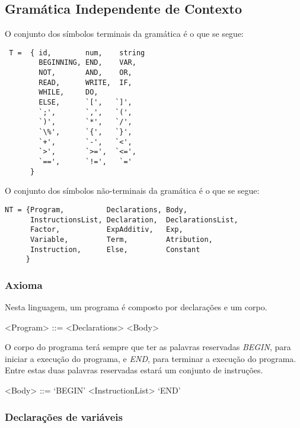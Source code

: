 \subsection{Gramática Independente de Contexto}
\label{subsec:gramatica:desenho}

O conjunto dos símbolos terminais da gramática é o que se segue:
\begin{verbatim}
 T =  { id,        num,    string  
        BEGINNING, END,    VAR, 
        NOT,       AND,    OR,  
        READ,      WRITE,  IF, 
        WHILE,     DO,   
        ELSE,      `[',   `]',   
        `;',       `,',   `(',   
        `)',       `*',   `/',   
        `\%',      `{',   `}',   
        `+',       `-',   `<',   
        `>',       `>=',  `<=', 
        `==',      `!=',   `=' 
      }
\end{verbatim}

O conjunto dos símbolos não-terminais da gramática é o que se segue:

\begin{verbatim}
NT = {Program,          Declarations, Body, 
      InstructionsList, Declaration,  DeclarationsList, 
      Factor,           ExpAdditiv,   Exp, 
      Variable,         Term,         Atribution,
      Instruction,      Else,         Constant 
     }
\end{verbatim}
\subsubsection{Axioma}
\label{subsec:subsubsec:axioma:desenho}

Nesta linguagem, um programa é composto por declarações e um corpo.

\begin{grammar}
<Program> ::= <Declarations> <Body> 
\end{grammar}

O corpo do programa terá sempre que ter as palavras reservadas \emph{BEGIN},
para iniciar a execução do programa, e \emph{END}, para terminar a execução do
programa. Entre estas duas palavras reservadas estará um conjunto de instruções.  

\begin{grammar}
<Body> ::= `BEGIN' <InstructionList> `END'
\end{grammar}


\subsubsection{Declarações de variáveis}
\label{subsec:subsubsec:declaracoes:desenho}

